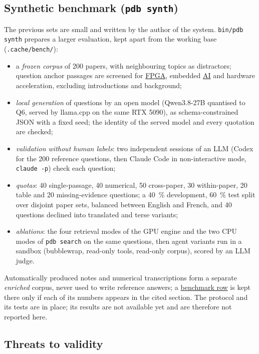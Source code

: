 \documentclass[11pt,a4paper]{article}
\newcommand{\cmd}[1]{\texttt{#1}}
\newcommand{\gl}[2]{\hyperlink{gl:#1}{\textcolor{glcolor}{#2}}}
\begin{document}
\subsection{Synthetic benchmark (\cmd{pdb synth})}
\label{sec:synth}

The previous sets are small and written by the author of the system. \cmd{bin/pdb synth}
prepares a larger evaluation, kept apart from the working base (\cmd{.cache/bench/}):
\begin{itemize}
  \item a \emph{frozen corpus} of 200 papers, with neighbouring topics as distractors;
    question anchor passages are screened for \gl{FPGA}{FPGA}, embedded \gl{AI}{AI} and hardware acceleration,
    excluding introductions and background;
  \item \emph{local generation} of questions by an open model (Qwen3.8-27B quantised to Q6,
    served by llama.cpp on the same RTX 5090), as schema-constrained JSON with a fixed seed;
    the identity of the served model and every quotation are checked;
  \item \emph{validation without human labels}: two independent sessions of an LLM (Codex
    for the 200 reference questions, then Claude Code in non-interactive mode,
    \cmd{claude -p}) check each question;
  \item \emph{quotas}: 40 single-passage, 40 numerical, 50 cross-paper, 30 within-paper, 20
    table and 20 missing-evidence questions; a 40~\% development, 60~\% test split over
    disjoint paper sets, balanced between English and French, and 40 questions declined into
    translated and terse variants;
  \item \emph{ablations}: the four retrieval modes of the GPU engine and the two CPU modes of
    \cmd{pdb search} on the same questions, then agent variants run in a sandbox (bubblewrap,
    read-only tools, read-only corpus), scored by an LLM judge.
\end{itemize}
Automatically produced notes and numerical transcriptions form a separate \emph{enriched}
corpus, never used to write reference answers; a \gl{benchmark}{benchmark row} is kept there only if each
of its numbers appears in the cited section. The protocol and its tests are in place; its
results are not available yet and are therefore not reported here.

\subsection{Threats to validity}
\end{document}
